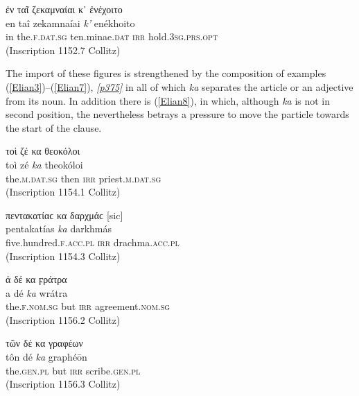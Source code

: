 \begin{exe}
\ex ἐν ταῖ ζεκαμναίαι κ᾽ ἐνέχοιτο\\
\gll en taî zekamnaíai \emph{k'} enékhoito\\
in the.\textsc{f.dat.sg} ten.minae.\textsc{dat} \textsc{irr} hold.\textsc{3sg.prs.opt}\\
\trans (Inscription 1152.7 Collitz)
\label{Elian2}
\end{exe}

The import of these figures is strengthened by the composition of examples (\ref{Elian3})--(\ref{Elian7}), \hyperlink{p375}{\emph{[p375]}} in all of which \textit{ka} separates the article or an adjective from its noun. In addition there is (\ref{Elian8}), in which, although \textit{ka} is not in second position, the  nevertheless betrays a pressure to move the particle towards the start of the clause.

\begin{exe}
\ex τοὶ ζέ κα θεοκόλοι\\
\gll toì zé \emph{ka} theokóloi\\
the.\textsc{m.dat.sg} then \textsc{irr} priest.\textsc{m.dat.sg}\\
\trans (Inscription 1154.1 Collitz)
\label{Elian3}
\end{exe}

\begin{exe}
\ex πεντακατίαϲ κα δαρχμάϲ {[}sic{]}\\
\gll pentakatías \emph{ka} darkhmás\\
five.hundred.\textsc{f.acc.pl} \textsc{irr} drachma.\textsc{acc.pl}\\
\trans (Inscription 1154.3 Collitz)
\label{Elian4}
\end{exe}

\begin{exe}
\ex ἀ δέ κα ϝράτρα\\
\gll a dé \emph{ka} wrátra\\
the.\textsc{f.nom.sg} but \textsc{irr} agreement.\textsc{nom.sg}\\
\trans (Inscription 1156.2 Collitz)
\label{Elian5}
\end{exe}

\begin{exe}
\ex τῶν δέ κα γραφέων\\
\gll tôn dé \emph{ka} graphéōn\\
the.\textsc{gen.pl} but \textsc{irr} scribe.\textsc{gen.pl}\\
\trans (Inscription 1156.3 Collitz)
\label{Elian6}
\end{exe}

